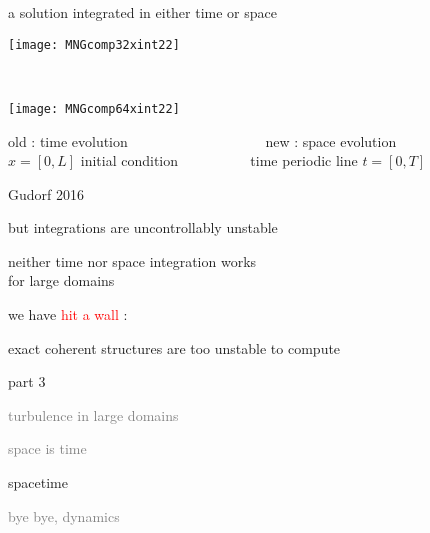 \begin{frame}{a solution integrated in either time or space}
\begin{center}
  \begin{minipage}[height=.40\textheight]{.35\textwidth}
    \centering %
    \texttt{[image: MNGcomp32xint22]}
  \end{minipage}
~~~~~~~~~
  \begin{minipage}[height=.40\textheight]{.35\textwidth}
    \centering %
    \texttt{[image: MNGcomp64xint22]}
  \end{minipage}
\end{center}
    {\color{red}old} : time evolution~~~~~~~~~~~~~~~~~~~
    {\color{red}new} : space evolution
    \\
    $x=[0,L]$ %
       initial condition ~~~~~~~~~ time periodic line $t = [0,T]$

\vfill\hfill        Gudorf 2016
\end{frame}

\begin{frame}{but integrations are uncontrollably unstable}

\begin{center}
{\huge neither} time {\huge nor} space integration {\huge works} \\
for large domains
\end{center}

\bigskip \bigskip

we have \textcolor{red}{\Huge hit a wall} :

\hfill exact coherent structures are too unstable to compute

\vfill
\color{red}{rethink the formulation!}
\end{frame}

\begin{frame}{part 3}
\begin{enumerate}
              \item
    \textcolor{gray}{\small
turbulence in large domains
              \item
space is time
    }
              \item {\Large
spacetime
    }\textcolor{gray}{\small
              \item
bye bye, dynamics
                    }
            \end{enumerate}
\end{frame}

